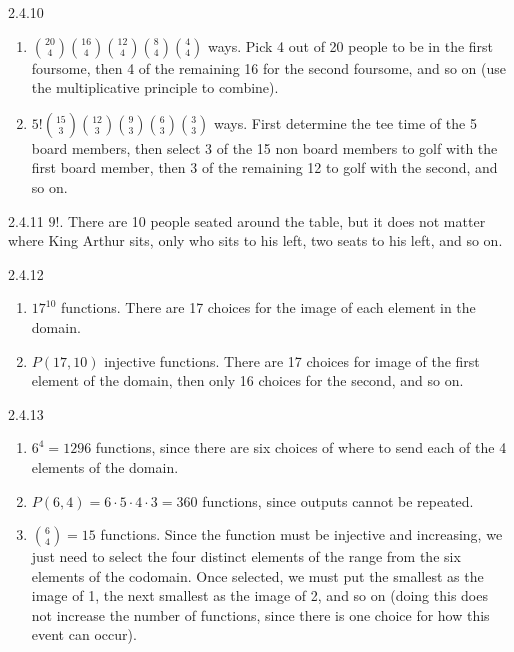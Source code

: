 \documentclass[11pt,]{book}
\theoremstyle{ptxplainnotitle}
\theoremstyle{ptxplaintitle}
\theoremstyle{ptxdefinitionnotitle}
\theoremstyle{ptxdefinitiontitle}
\theoremstyle{ptxdefinitionnotitle}
\theoremstyle{ptxdefinitiontitle}
\theoremstyle{ptxdefinitionnotitle}
\theoremstyle{ptxdefinitiontitle}
\theoremstyle{ptxdefinitiontitlenonumber}
\theoremstyle{ptxdefinitiontitlenonumber}
\numberwithin{equation}{chapter}
\begin{document}
\begin{divisionexercise}{2.4.10}
\textbf{}\hypertarget{p-1641}{}%
\leavevmode%
\begin{enumerate}[label=(\alph*)]
\item\hypertarget{li-691}{}\hypertarget{p-1642}{}%
\({20 \choose 4}{16 \choose 4}{12 \choose 4}{8 \choose 4}{4 \choose 4}\) ways. Pick 4 out of 20 people to be in the first foursome, then 4 of the remaining 16 for the second foursome, and so on (use the multiplicative principle to combine).%
\item\hypertarget{li-692}{}\hypertarget{p-1643}{}%
\(5!{15 \choose 3}{12 \choose 3}{9 \choose 3}{6 \choose 3}{3 \choose 3}\) ways. First determine the tee time of the 5 board members, then select 3 of the 15 non board members to golf with the first board member, then 3 of the remaining 12 to golf with the second, and so on.%
\end{enumerate}
%
\end{divisionexercise}%
\begin{divisionexercise}{2.4.11}
\textbf{}\hypertarget{p-1649}{}%
\(9!\text{.}\) There are 10 people seated around the table, but it does not matter where King Arthur sits, only who sits to his left, two seats to his left, and so on.%
\end{divisionexercise}%
\begin{divisionexercise}{2.4.12}
\textbf{}\hypertarget{p-1663}{}%
\leavevmode%
\begin{enumerate}[label=(\alph*)]
\item\hypertarget{li-699}{}\hypertarget{p-1664}{}%
\(17^{10}\) functions.  There are 17 choices for the image of each element in the domain.%
\item\hypertarget{li-700}{}\hypertarget{p-1665}{}%
\(P(17, 10)\) injective functions.  There are 17 choices for image of the first element of the domain, then only 16 choices for the second, and so on.%
\end{enumerate}
%
\end{divisionexercise}%
\begin{divisionexercise}{2.4.13}
\textbf{}\hypertarget{p-1684}{}%
\leavevmode%
\begin{enumerate}[label=(\alph*)]
\item\hypertarget{li-710}{}\hypertarget{p-1685}{}%
\(6^4 = 1296\) functions, since there are six choices of where to send each of the 4 elements of the domain.%
\item\hypertarget{li-711}{}\hypertarget{p-1686}{}%
\(P(6, 4) = 6 \cdot 5 \cdot 4 \cdot 3 = 360\) functions, since outputs cannot be repeated.%
\item\hypertarget{li-712}{}\hypertarget{p-1687}{}%
\({6 \choose 4} = 15\) functions. Since the function must be injective and increasing, we just need to select the four distinct elements of the range from the six elements of the codomain.  Once selected, we must put the smallest as the image of 1, the next smallest as  the image of 2, and so on (doing this does not increase the number of functions, since there is one choice for how this event can occur).%
\end{enumerate}
%
\end{divisionexercise}%
\end{document}
